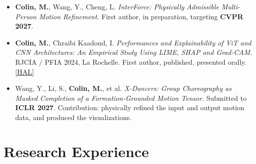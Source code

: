 \documentclass[10pt, letterpaper]{article}
\begin{document}
\begin{itemize}
    \item \textbf{Colin, M.}, Wang, Y., Cheng, L. \textit{InterForce: Physically Admissible Multi-Person Motion Refinement.} First author, in preparation, targeting \textbf{CVPR 2027}.
    \item \textbf{Colin, M.}, Chraibi Kaadoud, I. \textit{Performances and Explainability of ViT and CNN Architectures: An Empirical Study Using LIME, SHAP and Grad-CAM.} RJCIA / PFIA 2024, La Rochelle. First author, published, presented orally.
    \hfill \href{https://hal.science/hal-04641791}{[HAL]}
    \item Wang, Y., Li, S., \textbf{Colin, M.}, et al. \textit{X-Dancers: Group Choreography as Masked Completion of a Formation-Grounded Motion Tensor.} Submitted to \textbf{ICLR 2027}. Contribution: physically refined the input and output motion data, and produced the visualizations.
\end{itemize}

\section{Research Experience}
\end{document}

